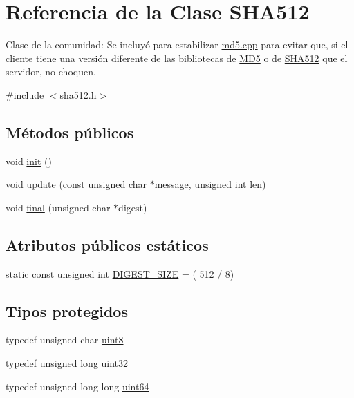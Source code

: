 \hypertarget{classSHA512}{}\section{Referencia de la Clase S\+H\+A512}
\label{classSHA512}


Clase de la comunidad\+: Se incluyó para estabilizar \hyperlink{md5_8cpp}{md5.\+cpp} para evitar que, si el cliente tiene una versión diferente de las bibliotecas de \hyperlink{classMD5}{M\+D5} o de \hyperlink{classSHA512}{S\+H\+A512} que el servidor, no choquen.  




{\ttfamily \#include $<$sha512.\+h$>$}

\subsection*{Métodos públicos}
\begin{DoxyCompactItemize}
\item 
void \hyperlink{classSHA512_a92d7e88a28d0bd70930df68bfcd4d136}{init} ()
\item 
void \hyperlink{classSHA512_aa1c4c23e601cbc51deda2fecbfed71d6}{update} (const unsigned char $\ast$message, unsigned int len)
\item 
void \hyperlink{classSHA512_a6db56be0379bbf38babee9567356ad68}{final} (unsigned char $\ast$digest)
\end{DoxyCompactItemize}
\subsection*{Atributos públicos estáticos}
\begin{DoxyCompactItemize}
\item 
static const unsigned int \hyperlink{classSHA512_a911d66aedbff405df349ef300791d8eb}{D\+I\+G\+E\+S\+T\+\_\+\+S\+I\+ZE} = ( 512 / 8)
\end{DoxyCompactItemize}
\subsection*{Tipos protegidos}
\begin{DoxyCompactItemize}
\item 
typedef unsigned char \hyperlink{classSHA512_a92a2b23b4b5217fefcb5b1884f40c054}{uint8}
\item 
typedef unsigned long \hyperlink{classSHA512_a52085ac598de8ad6c5f157eafcefc047}{uint32}
\item 
typedef unsigned long long \hyperlink{classSHA512_af8e6d233ae15030174e481d6d79b1786}{uint64}
\end{DoxyCompactItemize}
